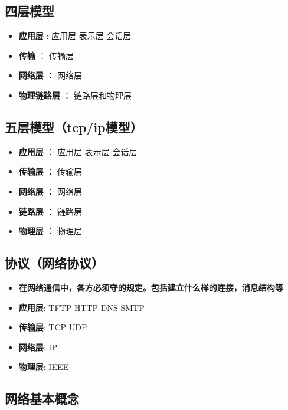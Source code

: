 \documentclass[11pt]{article}
\providecommand{\tightlist}{%
      \setlength{\itemsep}{0pt}\setlength{\parskip}{0pt}}
\begin{document}
\subsection{四层模型}\label{ux56dbux5c42ux6a21ux578b}

\begin{itemize}
\tightlist
\item
  \textbf{应用层} : 应用层 表示层 会话层
\item
  \textbf{传输} ： 传输层
\item
  \textbf{网络层} ： 网络层
\item
  \textbf{物理链路层} ： 链路层和物理层
\end{itemize}

\subsection{五层模型（tcp/ip模型）}\label{ux4e94ux5c42ux6a21ux578btcpipux6a21ux578b}

\begin{itemize}
\tightlist
\item
  \textbf{应用层} ： 应用层 表示层 会话层
\item
  \textbf{传输层} ： 传输层
\item
  \textbf{网络层} ： 网络层
\item
  \textbf{链路层} ： 链路层\\
\item
  \textbf{物理层} ： 物理层
\end{itemize}

\subsection{协议（网络协议）}\label{ux534fux8baeux7f51ux7edcux534fux8bae}

\begin{itemize}
\tightlist
\item
  \textbf{在网络通信中，各方必须守的规定。包括建立什么样的连接，消息结构等}
\item
  \textbf{应用层}: TFTP HTTP DNS SMTP
\item
  \textbf{传输层}: TCP UDP
\item
  \textbf{网络层}: IP
\item
  \textbf{物理层}: IEEE
\end{itemize}

\subsection{网络基本概念}\label{ux7f51ux7edcux57faux672cux6982ux5ff5}
\end{document}

